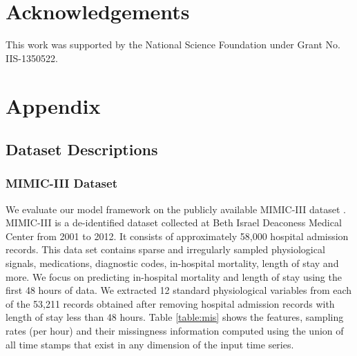 \documentclass{article} \usepackage{iclr2019_conference,times}
\begin{document}
 
\section*{Acknowledgements}

This work was supported by the National Science Foundation under Grant No. IIS-1350522. 






\appendix
\section{Appendix}
\subsection{Dataset Descriptions}
\label{dataset}
\subsubsection{MIMIC-III Dataset}
We evaluate our model framework on the publicly available MIMIC-III dataset \citep{johnson2016mimic}. MIMIC-III is a de-identified
dataset collected at Beth Israel Deaconess Medical Center
from 2001 to 2012. It consists of approximately 58,000 hospital admission records.  This data set contains sparse and irregularly sampled physiological signals, medications, diagnostic codes, in-hospital mortality, length of stay and more. We focus on predicting in-hospital mortality and length of stay using the first 48 hours of data. We extracted 12 standard physiological variables from each of the 53,211 records obtained after removing hospital admission records with length of stay less than 48 hours. Table \ref{table:mis} shows the features, sampling rates (per hour) and their missingness information computed using the union of all time stamps that exist in any dimension of the input time series. 
\end{document}
